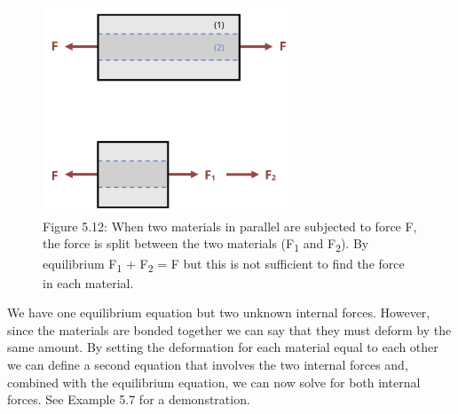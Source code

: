 \documentclass[
  letterpaper,
  DIV=11,
  numbers=noendperiod]{scrreprt}
\begin{document}
\begin{figure}[H]

{\centering \includegraphics[width=2.94792in,height=\textheight]{images/PNGs/Figure 5.13.png}

}

\caption{Figure 5.12: When two materials in parallel are subjected to
force F, the force is split between the two materials
(F\textsubscript{1} and F\textsubscript{2}). By equilibrium
F\textsubscript{1} + F\textsubscript{2} = F but this is not sufficient
to find the force in each material.}

\end{figure}%

We have one equilibrium equation but two unknown internal forces.
However, since the materials are bonded together we can say that they
must deform by the same amount. By setting the deformation for each
material equal to each other we can define a second equation that
involves the two internal forces and, combined with the equilibrium
equation, we can now solve for both internal forces. See Example 5.7 for
a demonstration.
\end{document}
